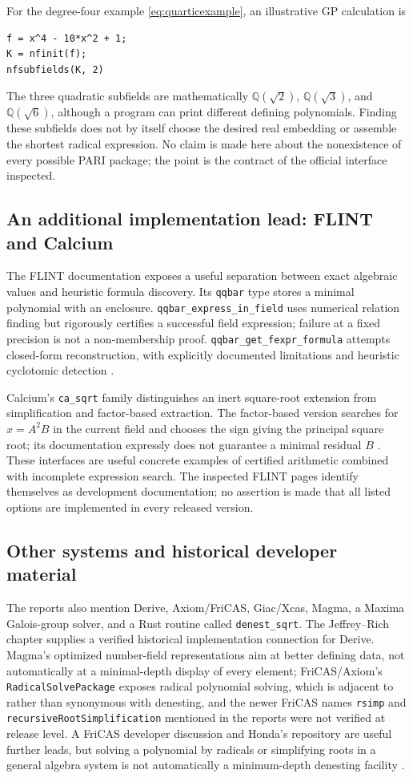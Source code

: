 \documentclass[11pt,oneside]{article}
\numberwithin{equation}{section}
\theoremstyle{definition}
\theoremstyle{remark}
\newcommand{\Q}{\mathbb{Q}}
\begin{document}
For the degree-four example \eqref{eq:quarticexample}, an illustrative GP calculation is
\begin{lstlisting}
f = x^4 - 10*x^2 + 1;
K = nfinit(f);
nfsubfields(K, 2)
\end{lstlisting}
The three quadratic subfields are mathematically $\Q(\sqrt2)$, $\Q(\sqrt3)$, and $\Q(\sqrt6)$, although a program can print different defining polynomials. Finding these subfields does not by itself choose the desired real embedding or assemble the shortest radical expression. No claim is made here about the nonexistence of every possible PARI package; the point is the contract of the official interface inspected.

\subsection{An additional implementation lead: FLINT and Calcium}
The FLINT documentation exposes a useful separation between exact algebraic values and heuristic formula discovery. Its \texttt{qqbar} type stores a minimal polynomial with an enclosure. \texttt{qqbar\_express\_in\_field} uses numerical relation finding but rigorously certifies a successful field expression; failure at a fixed precision is not a non-membership proof. \texttt{qqbar\_get\_fexpr\_formula} attempts closed-form reconstruction, with explicitly documented limitations and heuristic cyclotomic detection \cite{flint}.

Calcium's \texttt{ca\_sqrt} family distinguishes an inert square-root extension from simplification and factor-based extraction. The factor-based version searches for $x=A^2B$ in the current field and chooses the sign giving the principal square root; its documentation expressly does not guarantee a minimal residual $B$ \cite{calcium}. These interfaces are useful concrete examples of certified arithmetic combined with incomplete expression search. The inspected FLINT pages identify themselves as development documentation; no assertion is made that all listed options are implemented in every released version.

\subsection{Other systems and historical developer material}
The reports also mention Derive, Axiom/FriCAS, Giac/Xcas, Magma, a Maxima Galois-group solver, and a Rust routine called \texttt{denest\_sqrt}. The Jeffrey--Rich chapter supplies a verified historical implementation connection for Derive. Magma's optimized number-field representations aim at better defining data, not automatically at a minimal-depth display of every element; FriCAS/Axiom's \texttt{RadicalSolvePackage} exposes radical polynomial solving, which is adjacent to rather than synonymous with denesting, and the newer FriCAS names \texttt{rsimp} and \texttt{recursiveRootSimplification} mentioned in the reports were not verified at release level. A FriCAS developer discussion and Honda's repository are useful further leads, but solving a polynomial by radicals or simplifying roots in a general algebra system is not automatically a minimum-depth denesting facility \cite{magma,fricas,honda}.
\end{document}
